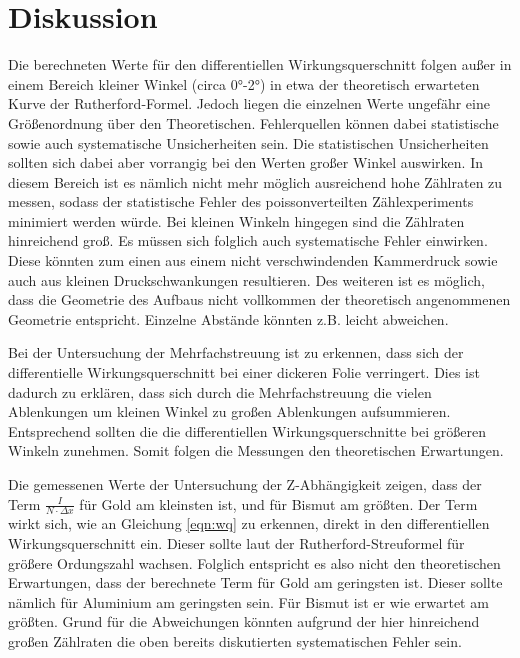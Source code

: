 \section{Diskussion}
\label{sec:Diskussion}

Die berechneten Werte für den differentiellen Wirkungsquerschnitt folgen außer in
einem Bereich kleiner Winkel (circa 0°-2°) in etwa der theoretisch erwarteten Kurve
der Rutherford-Formel. Jedoch liegen die einzelnen Werte ungefähr eine Größenordnung
über den Theoretischen. Fehlerquellen können dabei statistische sowie auch systematische
Unsicherheiten sein. Die statistischen Unsicherheiten sollten sich dabei aber vorrangig bei
den Werten großer Winkel auswirken. In diesem Bereich ist es nämlich nicht mehr möglich
ausreichend hohe Zählraten zu messen, sodass der statistische Fehler des poissonverteilten
Zählexperiments minimiert werden würde. Bei kleinen Winkeln hingegen sind die Zählraten hinreichend
groß. Es müssen sich folglich auch systematische Fehler einwirken. Diese könnten
zum einen aus einem nicht verschwindenden Kammerdruck sowie auch aus kleinen Druckschwankungen
resultieren. Des weiteren ist es möglich, dass die Geometrie des Aufbaus nicht vollkommen der
theoretisch angenommenen Geometrie entspricht. Einzelne Abstände könnten z.B. leicht abweichen.

Bei der Untersuchung der Mehrfachstreuung ist zu erkennen, dass sich der differentielle Wirkungsquerschnitt
bei einer dickeren Folie verringert. Dies ist dadurch zu erklären, dass sich durch die
Mehrfachstreuung die vielen Ablenkungen um kleinen Winkel zu großen Ablenkungen aufsummieren.
Entsprechend sollten die die differentiellen Wirkungsquerschnitte bei größeren Winkeln zunehmen.
Somit folgen die Messungen den theoretischen Erwartungen.

Die gemessenen Werte der Untersuchung der Z-Abhängigkeit zeigen, dass der Term $\frac{I}{N\cdot \Delta x}$
für Gold am kleinsten ist, und für Bismut am größten. Der Term wirkt sich, wie an
Gleichung \ref{eqn:wq} zu erkennen, direkt in den differentiellen Wirkungsquerschnitt ein.
Dieser sollte laut der Rutherford-Streuformel für größere Ordungszahl wachsen.
Folglich entspricht es also nicht den theoretischen Erwartungen, dass der berechnete
Term für Gold am geringsten ist. Dieser sollte nämlich für Aluminium am geringsten sein.
Für Bismut ist er wie erwartet am größten. Grund für die Abweichungen könnten aufgrund
der hier hinreichend großen Zählraten die oben bereits diskutierten systematischen
Fehler sein.
